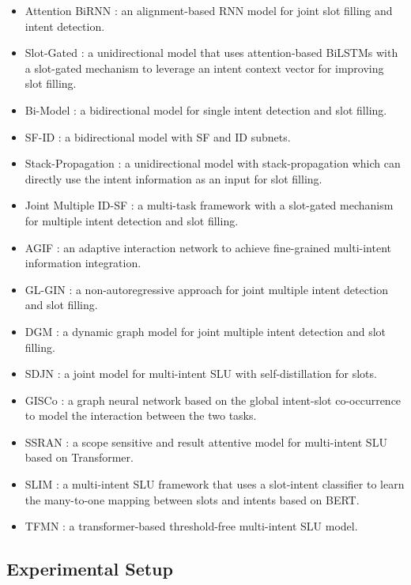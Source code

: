 \documentclass{ecai}
\begin{document}
\begin{itemize}
    \item Attention BiRNN \cite{liu:2016} : an alignment-based RNN model for joint slot filling and intent detection.
    \item Slot-Gated \cite{Goo:2018}: a unidirectional model that uses attention-based BiLSTMs with a slot-gated mechanism to leverage an intent context vector for improving slot filling.
    \item Bi-Model \cite{wang:2018}: a bidirectional model for single intent detection and slot filling.
    \item SF-ID \cite{Haihong:2019}: a bidirectional model with SF and ID subnets.
    \item Stack-Propagation \cite{Qin:2019}: a unidirectional model with stack-propagation which can directly use the intent information as an input for slot filling.
    \item Joint Multiple ID-SF \cite{gangadharaiah-narayanaswamy:2019}: a multi-task framework with a slot-gated mechanism for multiple intent detection and slot filling.
    \item AGIF \cite{qin:2020}: an adaptive interaction network to achieve fine-grained multi-intent information integration.
    \item GL-GIN \cite{qin:2021}: a non-autoregressive approach for joint multiple intent detection and slot filling.
    \item DGM \cite{ding:2021}: a dynamic graph model for joint multiple intent detection and slot filling.
    \item SDJN \cite{chen:2022}: a joint model for multi-intent SLU with self-distillation for slots.
    \item  GISCo \cite{song:2022}:  a graph neural network based on the global intent-slot co-occurrence to model the interaction between the two tasks.
    \item SSRAN \cite{cheng:2023}: a scope sensitive and result attentive model for multi-intent SLU based on Transformer.
    \item SLIM \cite{cai:2022}: a multi-intent SLU framework that uses a slot-intent classifier to learn the many-to-one mapping between slots and intents based on BERT. 
    \item TFMN \cite{chen-coling:2022}: a transformer-based threshold-free multi-intent SLU model.
\end{itemize}
\subsection{Experimental Setup}
\end{document}
